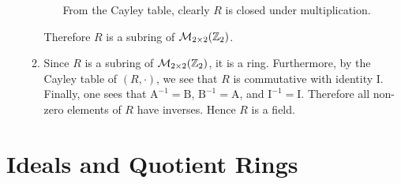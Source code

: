 \begin{enumerate}
\begin{enumerate}[label=(\roman*)]
\begin{itemize}
            From the Cayley table, clearly $R$ is closed under multiplication.
        \end{itemize}
        Therefore $R$ is a subring of $\mathcal{M}_{2\times2}(\mathbb{Z}_{2})$.

        \item Since $R$ is a subring of $\mathcal{M}_{2\times2}(\mathbb{Z}_{2})$, it is a ring. Furthermore, by the Cayley table of $(R, \cdot)$, we see that $R$ is commutative with identity I. Finally, one sees that $\mathrm{A}^{-1} = \mathrm{B}$, $\mathrm{B}^{-1} = \mathrm{A}$, and $\mathrm{I}^{-1} = \mathrm{I}$. Therefore all non-zero elements of $R$ have inverses. Hence $R$ is a field.
    \end{enumerate}
\end{enumerate}

\section{Ideals and Quotient Rings}
